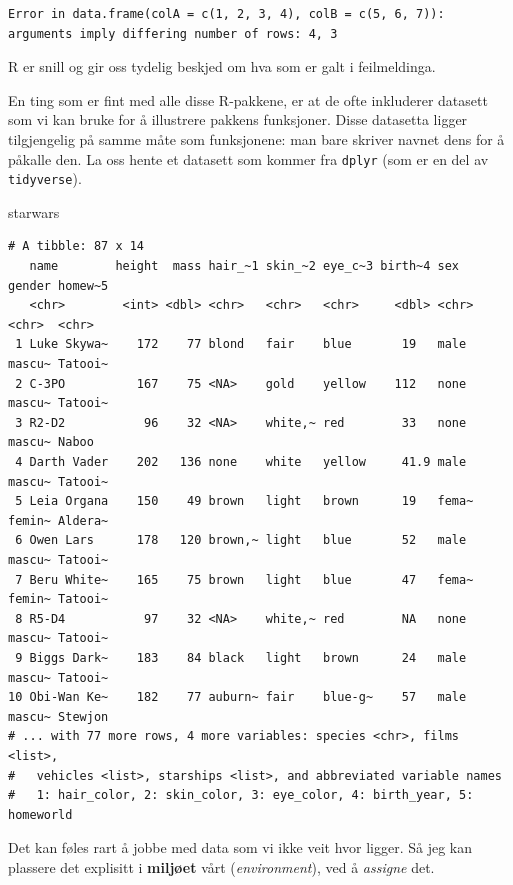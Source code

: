 \documentclass[
  letterpaper,
  DIV=11,
  numbers=noendperiod]{scrreprt}
\newenvironment{Shaded}{\begin{snugshade}}{\end{snugshade}}
\newcommand{\NormalTok}[1]{\textcolor[rgb]{0.00,0.23,0.31}{#1}}
\begin{document}
\begin{verbatim}
Error in data.frame(colA = c(1, 2, 3, 4), colB = c(5, 6, 7)): arguments imply differing number of rows: 4, 3
\end{verbatim}

R er snill og gir oss tydelig beskjed om hva som er galt i feilmeldinga.

En ting som er fint med alle disse R-pakkene, er at de ofte inkluderer
datasett som vi kan bruke for å illustrere pakkens funksjoner. Disse
datasetta ligger tilgjengelig på samme måte som funksjonene: man bare
skriver navnet dens for å påkalle den. La oss hente et datasett som
kommer fra \texttt{dplyr} (som er en del av \texttt{tidyverse}).

\begin{Shaded}
\begin{Highlighting}[]
\NormalTok{starwars}
\end{Highlighting}
\end{Shaded}

\begin{verbatim}
# A tibble: 87 x 14
   name        height  mass hair_~1 skin_~2 eye_c~3 birth~4 sex   gender homew~5
   <chr>        <int> <dbl> <chr>   <chr>   <chr>     <dbl> <chr> <chr>  <chr>  
 1 Luke Skywa~    172    77 blond   fair    blue       19   male  mascu~ Tatooi~
 2 C-3PO          167    75 <NA>    gold    yellow    112   none  mascu~ Tatooi~
 3 R2-D2           96    32 <NA>    white,~ red        33   none  mascu~ Naboo  
 4 Darth Vader    202   136 none    white   yellow     41.9 male  mascu~ Tatooi~
 5 Leia Organa    150    49 brown   light   brown      19   fema~ femin~ Aldera~
 6 Owen Lars      178   120 brown,~ light   blue       52   male  mascu~ Tatooi~
 7 Beru White~    165    75 brown   light   blue       47   fema~ femin~ Tatooi~
 8 R5-D4           97    32 <NA>    white,~ red        NA   none  mascu~ Tatooi~
 9 Biggs Dark~    183    84 black   light   brown      24   male  mascu~ Tatooi~
10 Obi-Wan Ke~    182    77 auburn~ fair    blue-g~    57   male  mascu~ Stewjon
# ... with 77 more rows, 4 more variables: species <chr>, films <list>,
#   vehicles <list>, starships <list>, and abbreviated variable names
#   1: hair_color, 2: skin_color, 3: eye_color, 4: birth_year, 5: homeworld
\end{verbatim}

Det kan føles rart å jobbe med data som vi ikke veit hvor ligger. Så jeg
kan plassere det explisitt i \textbf{miljøet} vårt (\emph{environment}),
ved å \emph{assigne} det.
\end{document}
